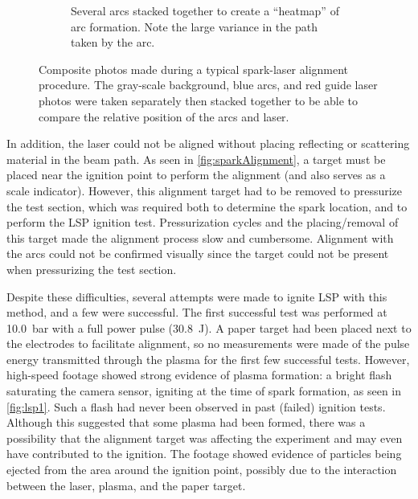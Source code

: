 \begin{figure}[h]
\begin{subfigure}[t]{0.47\textwidth}
                    \caption{Several arcs stacked together to create a ``heatmap'' of arc formation. Note the large variance in the path taken by the arc.}
                    \label{fig:sparkAlignment_heatmap}
                \end{subfigure}
                \caption[Composite photos made during a typical spark-laser alignment procedure]{Composite photos made during a typical spark-laser alignment procedure. The gray-scale background, blue arcs, and red guide laser photos were taken separately then stacked together to be able to compare the relative position of the arcs and laser.}
                \label{fig:sparkAlignment}
            \end{figure}

            In addition, the laser could not be aligned without placing reflecting or scattering material in the beam path. As seen in \autoref{fig:sparkAlignment}, a target must be placed near the ignition point to perform the alignment (and also serves as a scale indicator). However, this alignment target had to be removed to pressurize the test section, which was required both to determine the spark location, and to perform the LSP ignition test. Pressurization cycles and the placing/removal of this target made the alignment process slow and cumbersome. Alignment with the arcs could not be confirmed visually since the target could not be present when pressurizing the test section.

            Despite these difficulties, several attempts were made to ignite LSP with this method, and a few were successful. The first successful test was performed at \qty{10.0}{bar} with a full power pulse (\qty{30.8}{J}). A paper target had been placed next to the electrodes to facilitate alignment, so no measurements were made of the pulse energy transmitted through the plasma for the first few successful tests. However, high-speed footage showed strong evidence of plasma formation: a bright flash saturating the camera sensor, igniting at the time of spark formation, as seen in \autoref{fig:lsp1}. Such a flash had never been observed in past (failed) ignition tests. Although this suggested that some plasma had been formed, there was a possibility that the alignment target was affecting the experiment and may even have contributed to the ignition. The footage showed evidence of particles being ejected from the area around the ignition point, possibly due to the interaction between the laser, plasma, and the paper target.

